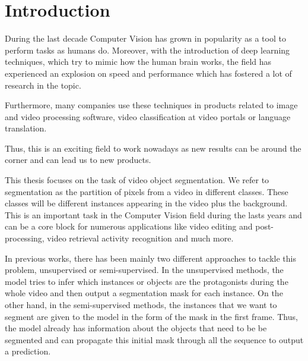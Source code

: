 
\chapter{Introduction}
\label{cha:introduction}

During the last decade Computer Vision has grown in popularity as a tool to perform tasks as humans do.
Moreover, with the introduction of deep learning techniques, which try to mimic how the human brain works, the field has experienced an explosion on speed and performance which has fostered a lot of research in the topic.

Furthermore, many companies use these techniques in products related to image and video processing software, video classification at video portals or language translation.

Thus, this is an exciting field to work nowadays as new results can be around the corner and can lead us to new products.


This thesis focuses on the task of video object segmentation.
We refer to segmentation as the partition of pixels from a video in different classes.
These classes will be different instances appearing in the video plus the background.
This is an important task in the Computer Vision field during the lasts years and can be a core block for numerous applications like video editing and post-processing, video retrieval activity recognition and much more.

In previous works, there has been mainly two different approaches to tackle this problem, unsupervised or semi-supervised.
In the unsupervised methods, the model tries to infer which instances or objects are the protagonists during the whole video and then output a segmentation mask for each instance.
On the other hand, in the semi-supervised methods, the instances that we want to segment are given to the model in the form of the mask in the first frame.
Thus, the model already has information about the objects that need to be be segmented and can propagate this initial mask through all the sequence to output a prediction.

